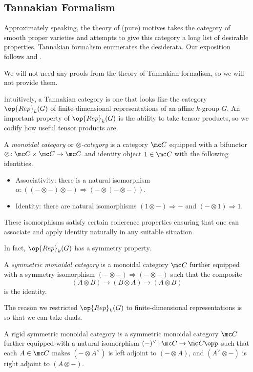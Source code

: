 \documentclass{article}
\begin{document}
\subsection{Tannakian Formalism}
Approximately speaking, the theory of (pure) motives takes the category of smooth proper varieties and attempts to give this category a long list of desirable properties. Tannakian formalism enumerates the desiderata. Our exposition follows \cite{milne-tannakian} and \cite[Chapters~2 and~6]{andre-motive}.
\begin{warn}
	We will not need any proofs from the theory of Tannakian formalism, so we will not provide them.
\end{warn}
Intuitively, a Tannakian category is one that looks like the category $\op{Rep}_k(G)$ of finite-dimensional representations of an affine $k$-group $G$. An important property of $\op{Rep}_k(G)$ is the ability to take tensor products, so we codify how useful tensor products are.
\begin{definition}[monoidal]
	A \textit{monoidal category} or \textit{$\otimes$-category} is a category $\mc C$ equipped with a bifunctor $\otimes\colon\mc C\times\mc C\to\mc C$ and identity object $1\in\mc C$ with the following identities.
	\begin{itemize}
		\item Associativity: there is a natural isomorphism $\alpha\colon((-\otimes-)\otimes-)\Rightarrow(-\otimes(-\otimes-))$.
		\item Identity: there are natural isomorphisms $(1\otimes-)\Rightarrow-$ and $(-\otimes1)\Rightarrow1$.
	\end{itemize}
	These isomorphisms satisfy certain coherence properties ensuring that one can associate and apply identity naturally in any suitable situation.
\end{definition}
In fact, $\op{Rep}_k(G)$ has a symmetry property.
\begin{definition}
	A \textit{symmetric monoidal category} is a monoidal category $\mc C$ further equipped with a symmetry isomorphism $(-\otimes-)\Rightarrow(-\otimes-)$ such that the composite
	\[(A\otimes B)\to(B\otimes A)\to(A\otimes B)\]
	is the identity.
\end{definition}
The reason we restricted $\op{Rep}_k(G)$ to finite-dimensional representations is so that we can take duals.
\begin{definition}[rigid]
	A rigid symmetric monoidal category is a symmetric monoidal category $\mc C$ further equipped with a natural isomorphism $(-)^\lor\colon\mc C\to\mc C\opp$ such that each $A\in\mc C$ makes $(-\otimes A^\lor)$ is left adjoint to $(-\otimes A)$, and $(A^\lor\otimes-)$ is right adjoint to $(A\otimes-)$.
\end{definition}
\end{document}
